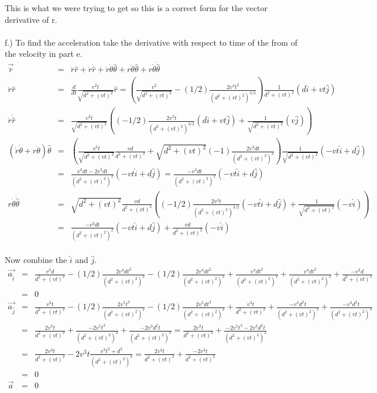 \documentclass[11pt]{amsart}
\begin{document}
This is what we were trying to get so this is a correct form for the vector derivative of r. \\ \\
f.) To find the acceleration take the derivative with respect to time of the from of the velocity in part e. \\ 
\begin{eqnarray*}
\vec{\ddot{r}} &=& \ddot{r}\hat{r} + \dot{r}\dot{\hat{r}} + \dot{r}\dot{\theta}\hat{\theta} + r\ddot{\theta}\hat{\theta} + r\dot{\theta}\dot{\hat{\theta}} \\
\ddot{r}\hat{r} &=& \frac{d}{dt}\frac{v^{2}t}{\sqrt{d^{2}+(vt)^{2}}} \hat{r}= (\frac{v^{2}}{\sqrt{d^{2}+(vt)^{2}}}-(1/2)\frac{2v^{4}t^{2}}{(d^{2}+(vt)^{2})^{3/2}})\frac{1}{d^{2}+(vt)^{2}}(d\hat{i}+vt\hat{j}) \\ 
\dot{r}\dot{\hat{r}} &=&\frac{v^{2}t}{\sqrt{d^{2}+(vt)^{2}}} ((-1/2)\frac{2v^{2}t}{(d^{2}+(vt)^{2})^{3/2}}(d\hat{i}+vt\hat{j}) + \frac{1}{\sqrt{d^{2}+(vt)^{2}}}(v\hat{j})) \\
(\dot{r}\dot{\theta}+r\ddot{\theta})\hat{\theta} &=& (\frac{v^{2}t}{\sqrt{d^{2}+(vt)^{2}}}\frac{vd}{d^{2}+(vt)^{2}} +\sqrt{d^{2}+(vt)^{2}}(-1)\frac{2v^{3}dt}{(d^{2}+(vt)^{2})^{2}})\frac{1}{\sqrt{d^{2}+(vt)^{2}}}(-vt\hat{i}+d\hat{j}) \\
&=&\frac{v^{3}dt-2v^{3}dt}{(d^{2}+(vt)^{2})^{2}}(-vt\hat{i}+d\hat{j}) = \frac{-v^{3}dt}{(d^{2}+(vt)^{2})^{2}}(-vt\hat{i}+d\hat{j}) \\
r\dot{\theta}\dot{\hat{\theta}} &=& \sqrt{d^{2}+(vt)^{2}}\frac{vd}{d^{2}+(vt)^{2}} ((-1/2)\frac{2v^{2}t}{(d^{2}+(vt)^{2})^{3/2}}(-vt\hat{i}+d\hat{j}) + \frac{1}{\sqrt{d^{2}+(vt)^{2}}}(-v\hat{i})) \\
&=& \frac{-v^{3}dt}{(d^{2}+(vt)^{2})^{2}}(-vt\hat{i}+d\hat{j}) +\frac{vd}{d^{2}+(vt)^{2}}(-v\hat{i})
\end{eqnarray*} \\
Now combine the $\hat{i}$ and $\hat{j}$. \\ 
\begin{eqnarray*}
\vec{a_{\hat{i}}} &=&\frac{v^{2}d}{d^{2}+(vt)^{2}}-(1/2)\frac{2v^{4}dt^{2}}{(d^{2}+(vt)^{2})^{2}} -(1/2)\frac{2v^{4}dt^{2}}{(d^{2}+(vt)^{2})^{2}} +\frac{v^{4}dt^{2}}{(d^{2}+(vt)^{2})^{2}}+\frac{v^{4}dt^{2}}{(d^{2}+(vt)^{2})^{2}}+\frac{-v^{2}d}{d^{2}+(vt)^{2}} \\
&=& 0 \\
\vec{a_{\hat{j}}} &=&\frac{v^{3}t}{d^{2}+(vt)^{2}}-(1/2)\frac{2v^{5}t^{3}}{(d^{2}+(vt)^{2})^{2}} -(1/2)\frac{2v^{5}dt^{3}}{(d^{2}+(vt)^{2})^{2}} +\frac{v^{3}t}{d^{2}+(vt)^{2}}+\frac{-v^{3}d^{2}t}{(d^{2}+(vt)^{2})^{2}}+\frac{-v^{3}d^{2}t}{(d^{2}+(vt)^{2})^{2}} \\
&=&\frac{2v^{3}t}{d^{2}+(vt)^{2}}+\frac{-2v^{5}t^{3}}{(d^{2}+(vt)^{2})^{2}} +\frac{-2v^{3}d^{2}t}{(d^{2}+(vt)^{2})^{2}} = \frac{2v^{3}t}{d^{2}+(vt)^{2}} + \frac{-2v^{5}t^{3}-2v^{3}d^{2}t}{(d^{2}+(vt)^{2})^{2}}  \\
&=&\frac{2v^{3}t}{d^{2}+(vt)^{2}} -2v^{3}t\frac{v^{2}t^{2}+d^{2}}{(d^{2}+(vt)^{2})^{2}} = \frac{2v^{3}t}{d^{2}+(vt)^{2}}+\frac{-2v^{3}t}{d^{2}+(vt)^{2}} \\
&=& 0 \\
\vec{a} &=& 0 
\end{eqnarray*} \\
\end{document}
